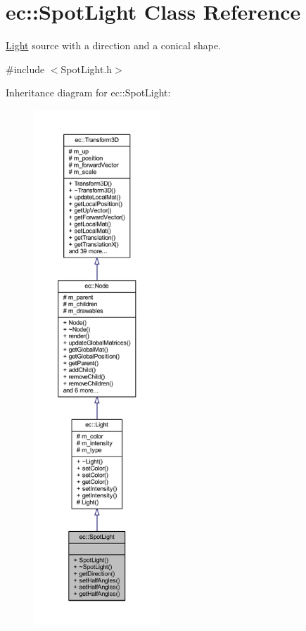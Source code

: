 \hypertarget{classec_1_1_spot_light}{}\section{ec\+:\+:Spot\+Light Class Reference}
\label{classec_1_1_spot_light}


\mbox{\hyperlink{classec_1_1_light}{Light}} source with a direction and a conical shape.  




{\ttfamily \#include $<$Spot\+Light.\+h$>$}



Inheritance diagram for ec\+:\+:Spot\+Light\+:\nopagebreak
\begin{figure}[H]
\begin{center}
\leavevmode
\includegraphics[height=550pt]{classec_1_1_spot_light__inherit__graph}
\end{center}
\end{figure}


